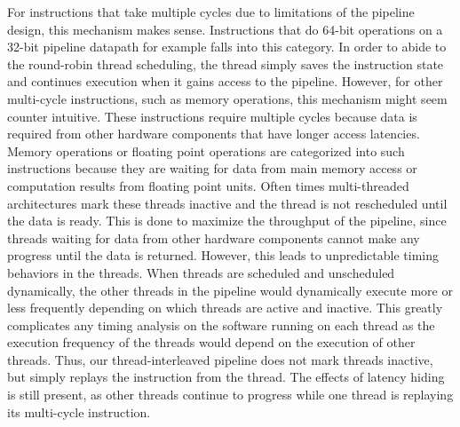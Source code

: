 For instructions that take multiple cycles due to limitations of the pipeline design, this mechanism makes sense.
Instructions that do 64-bit operations on a 32-bit pipeline datapath for example falls into this category. 
In order to abide to the round-robin thread scheduling, the thread simply saves the instruction state and continues execution when it gains access to the pipeline. 
However, for other multi-cycle instructions, such as memory operations, this mechanism might seem counter intuitive. 
These instructions require multiple cycles because data is required from other hardware components that have longer access latencies.
Memory operations or floating point operations are categorized into such instructions because they are waiting for data from main memory access or computation results from floating point units.
Often times multi-threaded architectures mark these threads inactive and the thread is not rescheduled until the data is ready.
This is done to maximize the throughput of the pipeline, since threads waiting for data from other hardware components cannot make any progress until the data is returned. 
However, this leads to unpredictable timing behaviors in the threads.
When threads are scheduled and unscheduled dynamically, the other threads in the pipeline would dynamically execute more or less frequently depending on which threads are active and inactive.
This greatly complicates any timing analysis on the software running on each thread as the execution frequency of the threads would depend on the execution of other threads.
Thus, our thread-interleaved pipeline does not mark threads inactive, but simply replays the instruction from the thread.
The effects of latency hiding is still present, as other threads continue to progress while one thread is replaying its multi-cycle instruction.  


